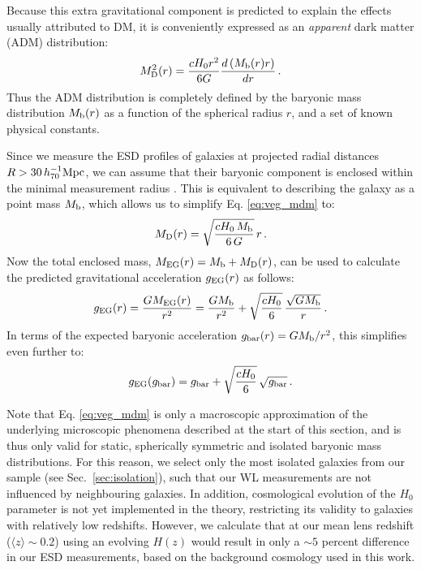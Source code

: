 \documentclass[usenatbib]{mnras}
\newcommand{\hsMpc}{\, h_{70}^{-1}{\rm{Mpc}} }
\newcommand{\un}[1]{_{\rm #1}}
\begin{document}
Because this extra gravitational component is predicted to explain the effects usually attributed to DM, it is conveniently expressed as an \emph{apparent} dark matter (ADM) distribution:
\begin{equation}
M\un{D}^2 (r) = \frac{  cH_0 r^2}{6G} \frac{d\left( M\un{b}(r) r \right)}{dr} \, .
\label{eq:veg_mdm}
\end{equation}
Thus the ADM distribution is completely defined by the baryonic mass distribution $M\un{b}(r)$ as a function of the spherical radius $r$, and a set of known physical constants.

Since we measure the ESD profiles of galaxies at projected radial distances $R>30 \hsMpc$, we can assume that their baryonic component is enclosed within the minimal measurement radius \cite[see also][]{brouwer2017}. This is equivalent to describing the galaxy as a point mass $M\un{b}$, which allows us to simplify Eq. \ref{eq:veg_mdm} to:
\begin{equation}
M\un{D}(r)=\sqrt{\frac{cH_{0} \, M\un{b}}{6 \, G}} \, r \, .
\end{equation}
Now the total enclosed mass, $M\un{EG}(r) = M\un{b} + M\un{D}(r)$, can be used to calculate the predicted gravitational acceleration $g\un{EG}(r)$ as follows:
\begin{equation}
	g\un{EG}(r) = \frac{G M\un{EG}(r)}{r^2} = \frac{G M\un{b}}{r^2} + \sqrt{\frac{cH_{0}}{6}} \, \frac{\sqrt{G M\un{b}}}{r} \, .
\end{equation}
In terms of the expected baryonic acceleration $g\un{bar}(r) = G M\un{b}/r^2$, this simplifies even further to:
\begin{equation}
\label{eq:rar_verlinde}
g\un{EG}(g\un{bar}) = g\un{bar} + \sqrt{\frac{cH_{0}}{6}} \, \sqrt{g\un{bar}} \, .
\end{equation}

Note that Eq. \ref{eq:veg_mdm} is only a macroscopic approximation of the underlying microscopic phenomena described at the start of this section, and is thus only valid for static, spherically symmetric and isolated baryonic mass distributions. For this reason, we select only the most isolated galaxies from our sample (see Sec.~\ref{sec:isolation}), such that our WL measurements are not influenced by neighbouring galaxies. In addition, cosmological evolution of the $H_0$ parameter is not yet implemented in the theory, restricting its validity to galaxies with relatively low redshifts. However, we calculate that at our mean lens redshift ($\langle z \rangle \sim 0.2$) using an evolving $H(z)$ would result in only a $\sim5$ percent difference in our ESD measurements, based on the background cosmology used in this work.
\end{document}
